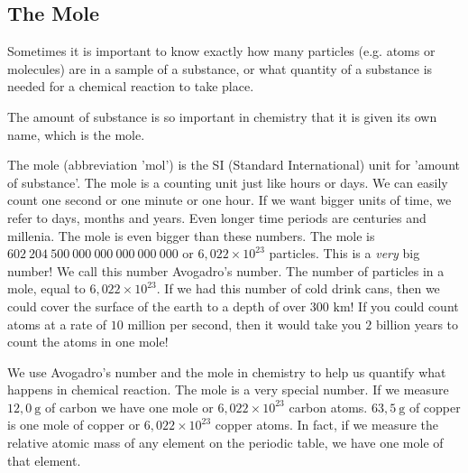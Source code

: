             \subsection*{The Mole}
            \nopagebreak
      \label{m38717*id275573}Sometimes it is important to know exactly how many particles (e.g. atoms or molecules) are in a sample of a substance, or what quantity of a substance is needed for a chemical reaction to take place.\par 
\label{m38717*eip-872}The amount of substance is so important in chemistry that it is given its own name, which is the mole.  \par \label{m38717*fhsst!!!underscore!!!id119}
 { The mole (abbreviation 'mol') is the SI (Standard International) unit for 'amount of substance'.  } 
The mole is a counting unit just like hours or days. We can easily count one second or one minute or one hour. If we want bigger units of time, we refer to days, months and years. Even longer time periods are centuries and millenia. The mole is even bigger than these numbers. The mole is $602 ~204 ~500 ~000 ~000 ~000 ~000 ~000$ or $6,022 \times 10^{23}$ particles. This is a \textsl{very} big number! We call this number Avogadro's number. \label{m38717*fhsst!!!underscore!!!id123}
 { The number of particles in a mole, equal to $6,022\ensuremath{\times}{10}^{23}$. } 
\label{m38717*eip-446}If we had this number of cold drink cans, then we could cover the surface of the earth to a depth of over $300 \text{ km}$! If you could count atoms at a rate of $10$ million per second, then it would take you $2$ billion years to count the atoms in one mole!\par \label{m38717*notfhsst!!!underscore!!!id126}
We use Avogadro's number and the mole in chemistry to help us quantify what happens in chemical reaction. The mole is a very special number. If we measure $12,0 ~\text{g}$ of carbon we have one mole or $6,022 \times 10^{23}$ carbon atoms. $63,5 ~\text{g}$ of copper is one mole of copper or $6,022 \times 10^{23}$ copper atoms. In fact, if we measure the relative atomic mass of any element on the periodic table, we have one mole of that element.
